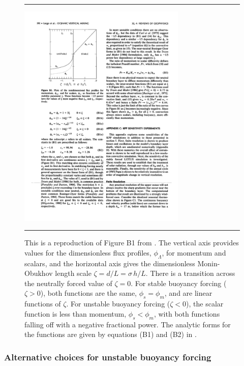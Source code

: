  
\begin{figure}[h!t]
\rule{\textwidth}{0.005in}
\begin{center}
\includegraphics[angle=0,width=8cm]{./figs/LargeKPP_figB1.pdf}
\caption[Figure B1 from \cite{LargeKPP}]{\sf This is a reproduction of
  Figure B1 from \cite{LargeKPP}.  The vertical axis provides values
  for the dimensionless flux profiles, $\phi_{\Lambda}$, for momentum
  and scalars, and the horizontal axis gives the dimensionless
  Monin-Obukhov length scale $\zeta = d/L = \sigma \, h/L$.  There is
  a transition across the neutrally forced value of $\zeta = 0$.  For
  stable buoyancy forcing ($\zeta > 0$), both functions are the same,
  $\phi_{s} = \phi_{m}$, and are linear functions of $\zeta$. For
  unstable buoyancy forcing ($\zeta < 0$), the scalar function is less
  than momentum, $\phi_{s} < \phi_{m}$, with both functions falling
  off with a negative fractional power.  The analytic forms for the
  functions are given by equations (B1) and (B2) in \cite{LargeKPP}.}
\label{fig:large-etal-figureB1}
\end{center}
\rule{\textwidth}{0.005in}
\end{figure}


\subsubsection{Alternative choices for unstable buoyancy forcing}
\label{subsubsection:alternative-similarity-functions}

